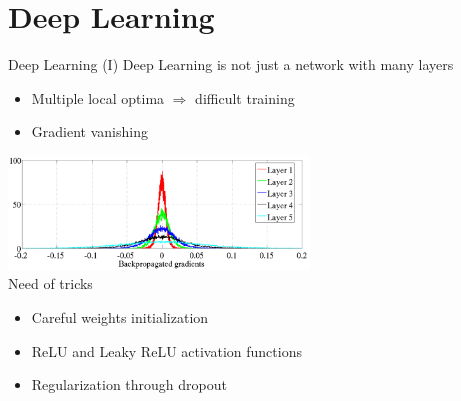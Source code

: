 \documentclass[10pt,compress]{beamer} %
\begin{document}
%

\section{Deep Learning}

\begin{frame}{Deep Learning (I)}
     Deep Learning is not just a network with many layers
	\begin{itemize}
		\item Multiple local optima $\Rightarrow$ difficult training
		\item Gradient vanishing
	\end{itemize}

	\centering
	\includegraphics[width=0.6\textwidth]{figs/gradients.png}\\

	\normalsize
	\flushleft
	Need of tricks
	\begin{itemize}
		\item Careful weights initialization
		\item ReLU and Leaky ReLU activation functions
		\item Regularization through \alert{dropout}
	\end{itemize}
\end{frame}
\end{document}

